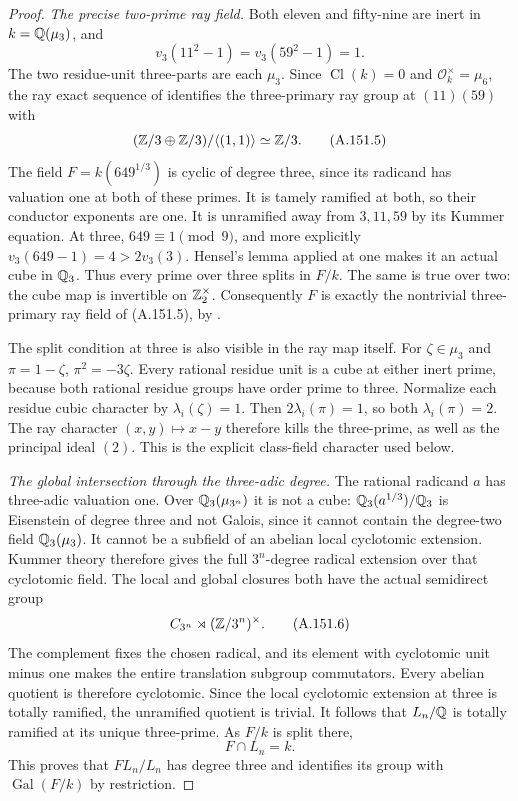 \begin{proof}
\emph{The precise two-prime ray field.}
Both eleven and fifty-nine are inert in
\(k=\mathbb Q(\mu_3)\), and
\[
 v_3(11^2-1)=v_3(59^2-1)=1.
\tag{A.151.4}
\]
The two residue-unit three-parts are each \(\mu_3\).
Since \(\operatorname{Cl}(k)=0\) and
\(\mathcal O_k^\times=\mu_6\), the ray exact
sequence of \cite[V, Theorem 1.7]{MilneCFT}
identifies the three-primary ray group at
\((11)(59)\) with
\[
                   (\mathbb Z/3\oplus\mathbb Z/3)/\langle(1,1)\rangle
                                      \simeq\mathbb Z/3.
\tag{A.151.5}
\]
The field \(F=k(649^{1/3})\) is cyclic of degree
three, since its radicand has valuation one at
both of these primes.
It is tamely ramified at both, so their conductor
exponents are one.
It is unramified away from \(3,11,59\) by its
Kummer equation.
At three, \(649\equiv1\pmod9\), and more
explicitly
\(v_3(649-1)=4>2v_3(3)\).
Hensel's lemma applied at one makes it an actual
cube in \(\mathbb Q_3\).
Thus every prime over three splits in \(F/k\).
The same is true over two: the cube map is
invertible on \(\mathbb Z_2^\times\).
Consequently \(F\) is exactly the nontrivial
three-primary ray field of (A.151.5), by
\cite[V, Theorems 3.5--3.6]{MilneCFT}.

The split condition at three is also visible
in the ray map itself.
For \(\zeta\in\mu_3\) and \(\pi=1-\zeta\),
\(\pi^2=-3\zeta\).
Every rational residue unit is a cube at
either inert prime, because both rational
residue groups have order prime to three.
Normalize each residue cubic character by
\(\lambda_i(\zeta)=1\).
Then \(2\lambda_i(\pi)=1\), so both
\(\lambda_i(\pi)=2\).
The ray character \((x,y)\mapsto x-y\)
therefore kills the three-prime, as well
as the principal ideal \((2)\).
This is the explicit class-field character
used below.

\emph{The global intersection through the three-adic degree.}
The rational radicand \(a\) has three-adic
valuation one.
Over \(\mathbb Q_3(\mu_{3^n})\) it is not a cube:
\(\mathbb Q_3(a^{1/3})/\mathbb Q_3\) is Eisenstein of
degree three and not Galois, since it cannot
contain the degree-two field \(\mathbb Q_3(\mu_3)\).
It cannot be a subfield of an abelian local
cyclotomic extension.
Kummer theory therefore gives the full
\(3^n\)-degree radical extension over that
cyclotomic field.
The local and global closures both have
the actual semidirect group
\[
              C_{3^n}\rtimes(\mathbb Z/3^n)^\times.
\tag{A.151.6}
\]
The complement fixes the chosen radical,
and its element with cyclotomic unit minus
one makes the entire translation subgroup
commutators.
Every abelian quotient is therefore
cyclotomic.  Since the local cyclotomic
extension at three is totally ramified,
the unramified quotient is trivial.
It follows that \(L_n/\mathbb Q\) is totally
ramified at its unique three-prime.
As \(F/k\) is split there,
\[
                              F\cap L_n=k.
\tag{A.151.7}
\]
This proves that \(FL_n/L_n\) has degree
three and identifies its group with
\(\operatorname{Gal}(F/k)\) by restriction.


\end{proof}
